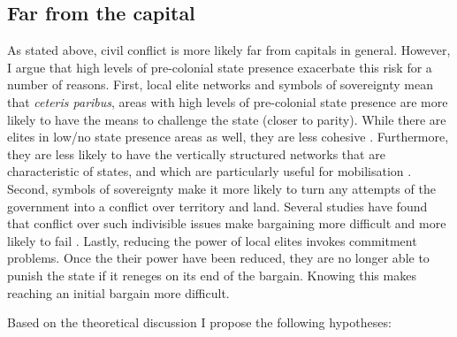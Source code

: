 \documentclass[12pt]{article}
\begin{document}
\subsection{Far from the capital} \label{Far from the capital}

As stated above, civil conflict is more likely far from capitals in general.
However, I argue that high levels of pre-colonial state presence exacerbate this
risk for a number of reasons. First, local elite networks and symbols of
sovereignty mean that \textit{ceteris paribus}, areas with high levels of
pre-colonial state presence are more likely to have the means to challenge the
state (closer to parity). While there are elites in low/no
state presence areas as well, they are less cohesive \citep{Wilfahrt_2021}.
Furthermore, they are less likely to have the vertically
structured networks that are characteristic of states, and which are
particularly useful for mobilisation \citep{Staniland2014}. Second, symbols of
sovereignty make it more likely to turn any attempts of the government into a
conflict over territory and land. Several studies have found that conflict over
such indivisible issues make bargaining more difficult and more likely to fail
\citep{ToftMonicaDuffy2003Tgoe}. Lastly, reducing the power of local elites
invokes commitment problems. Once the their power have been reduced, they are no
longer able to punish the state if it reneges on its end of the bargain. Knowing
this makes reaching an initial bargain more difficult. 

	
Based on the theoretical discussion I propose the following hypotheses:
\end{document}
